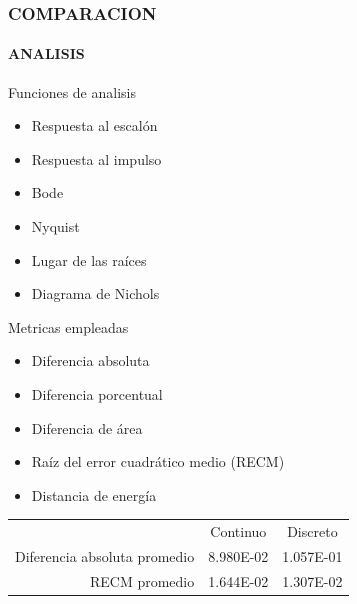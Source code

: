\documentclass[usenames,xcolor={dvipsnames, table}]{beamer}
\begin{document}
\begin{frame}
	\frametitle{COMPARACION}
	\framesubtitle{ANALISIS}
	\vspace{20pt}
	\small
	\begin{block}{Funciones de analisis}
		\footnotesize
		\begin{multicols}{2}
		\begin{itemize}
			\item Respuesta al escalón
			\item Respuesta al impulso
			\item Bode
			\item Nyquist
			\item Lugar de las raíces 
			\item Diagrama de Nichols
		\end{itemize}
	\end{multicols}
	\end{block}

	\begin{block}{Metricas empleadas}
		\footnotesize
		\begin{multicols}{2}
		\begin{itemize}
			\item Diferencia absoluta
			\item Diferencia porcentual
			\item Diferencia de área
			\item Raíz del error cuadrático medio (RECM)
			\item Distancia de energía
		\end{itemize}
	\end{multicols}
	\end{block}

	\begin{table}
		\begin{tabular}{rcc}
										& Continuo 			& Discreto 			\\
		Diferencia absoluta promedio	& \num{8.980E-02}	& \num{1.057E-01}	\\
		RECM promedio					& \num{1.644E-02}	& \num{1.307E-02} 	\\
		\end{tabular}
	\end{table}
\end{frame}
\end{document}
